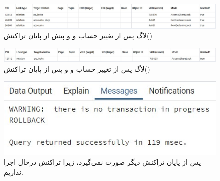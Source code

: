 \documentclass{article}
\begin{document}
\subsection{}
\subsection{}
\begin{figure}[H]
    \centering
    \includegraphics[width=1\textwidth]{figures/8-b-1.jpg}
    \caption
	{
لاگ پس از تغییر حساب  و  و پیش از پایان تراکنش()
	}
    \label{fig:fig1}
\end{figure}
\begin{figure}[H]
    \centering
    \includegraphics[width=1\textwidth]{figures/8-b-2.jpg}
    \caption
	{
لاگ پس از تغییر حساب  و  و پس از پایان تراکنش()
	}
    \label{fig:fig1}
\end{figure}
\begin{figure}[H]
    \centering
    \includegraphics[width=1\textwidth]{figures/8-b-3.jpg}
    \caption
	{
پس از پایان تراکنش دیگر  صورت نمی‌گیرد، زیرا تراکنش درحال اجرا نداریم.
	}
    \label{fig:fig1}
\end{figure}
\end{document}
